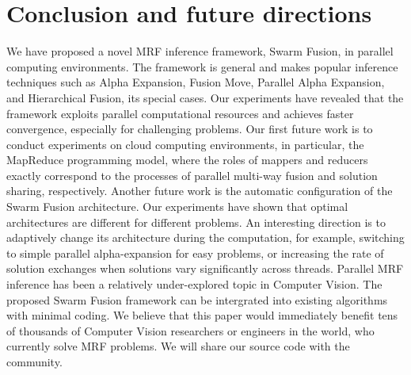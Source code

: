 \section{Conclusion and future directions}
We have proposed a novel MRF inference framework, Swarm Fusion, in
parallel computing environments. The framework is general and makes
popular inference techniques such as Alpha Expansion, Fusion Move,
Parallel Alpha Expansion, and Hierarchical Fusion, its special cases. Our
experiments have revealed that the framework exploits parallel
computational resources and achieves faster convergence, especially for
challenging problems.  Our first future work is to conduct experiments
on cloud computing environments, in particular, the MapReduce
programming model, where the roles of mappers and reducers exactly
correspond to the processes of parallel multi-way fusion and solution
sharing, respectively.  Another future work is the automatic
configuration of the Swarm Fusion architecture.  Our experiments have
shown that optimal architectures are different for different problems.
An interesting direction is to adaptively change its architecture during
the computation, for example, switching to simple parallel
alpha-expansion for easy problems, or increasing the rate of solution
exchanges when solutions vary significantly across threads.
%
Parallel MRF inference has been a relatively under-explored topic in
Computer Vision.
%
%
The proposed Swarm Fusion framework can be intergrated into existing
algorithms with minimal coding.  We believe that this paper would
immediately benefit tens of thousands of Computer Vision researchers
or engineers in the world, who currently solve MRF problems. We will
share our source code with the community.
